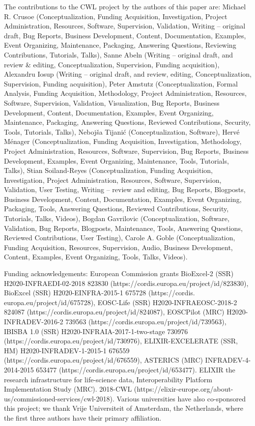 \documentclass[
]{article}
\begin{document}
The contributions to the CWL project by the authors of this paper are:
Michael R. Crusoe (Conceptualization, Funding Acquisition,
Investigation, Project Administration, Resources, Software, Supervision,
Validation, Writing -- original draft, Bug Reports, Business
Development, Content, Documentation, Examples, Event Organizing,
Maintenance, Packaging, Answering Questions, Reviewing Contributions,
Tutorials, Talks), Sanne Abeln (Writing -- original draft, and review \&
editing, Conceptualization, Supervision, Funding acquisition), Alexandru
Iosup (Writing -- original draft, and review, editing,
Conceptualization, Supervision, Funding acquisition), Peter Amstutz
(Conceptualization, Formal Analysis, Funding Acquisition, Methodology,
Project Administration, Resources, Software, Supervision, Validation,
Visualization, Bug Reports, Business Development, Content,
Documentation, Examples, Event Organizing, Maintenance, Packaging,
Answering Questions, Reviewed Contributions, Security, Tools, Tutorials,
Talks), Nebojša Tijanić (Conceptualization, Software), Hervé Ménager
(Conceptualization, Funding Acquisition, Investigation, Methodology,
Project Administration, Resources, Software, Supervision, Bug Reports,
Business Development, Examples, Event Organizing, Maintenance, Tools,
Tutorials, Talks), Stian Soiland-Reyes (Conceptualization, Funding
Acquisition, Investigation, Project Administration, Resources, Software,
Supervision, Validation, User Testing, Writing -- review and editing,
Bug Reports, Blogposts, Business Development, Content, Documentation,
Examples, Event Organizing, Packaging, Tools, Answering Questions,
Reviewed Contributions, Security, Tutorials, Talks, Videos), Bogdan
Gavrilovic (Conceptualization, Software, Validation, Bug Reports,
Blogposts, Maintenance, Tools, Answering Questions, Reviewed
Contributions, User Testing), Carole A. Goble (Conceptualization,
Funding Acquisition, Resources, Supervision, Audio, Business
Development, Content, Examples, Event Organizing, Tools, Talks, Videos).

Funding acknowledgements: European Commission grants BioExcel-2 (SSR)
H2020-INFRAEDI-02-2018 823830
(https://cordis.europa.eu/project/id/823830), BioExcel (SSR)
H2020-EINFRA-2015-1 675728 (https://cordis.
europa.eu/project/id/675728), EOSC-Life (SSR) H2020-INFRAEOSC-2018-2
824087 (https://cordis.europa.eu/project/id/824087), EOSCPilot (MRC)
H2020-INFRADEV-2016-2 739563
(https://cordis.europa.eu/project/id/739563), IBISBA 1.0 (SSR)
H2020-INFRAIA-2017-1-two-stage 730976
(https://cordis.europa.eu/project/id/730976), ELIXIR-EXCELERATE (SSR,
HM) H2020-INFRADEV-1-2015-1 676559
(https://cordis.europa.eu/project/id/676559), ASTERICS (MRC)
INFRADEV-4-2014-2015 653477
(https://cordis.europa.eu/project/id/653477). ELIXIR the research
infrastructure for life-science data, Interoperability Platform
Implementation Study (MRC). 2018-CWL
(https://elixir-europe.org/about-us/commissioned-services/cwl-2018).
Various universities have also co-sponsored this project; we thank Vrije
Universiteit of Amsterdam, the Netherlands, where the first three
authors have their primary affiliation.
\end{document}
